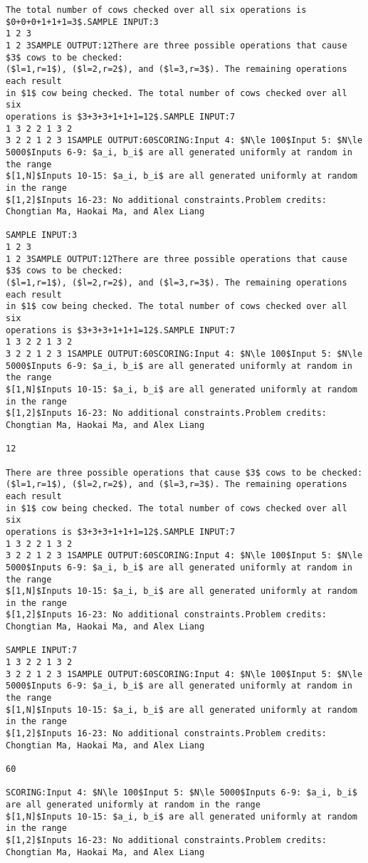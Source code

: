 \documentclass[12pt]{article}
\begin{document}
\begin{verbatim}
The total number of cows checked over all six operations is $0+0+0+1+1+1=3$.SAMPLE INPUT:3
1 2 3
1 2 3SAMPLE OUTPUT:12There are three possible operations that cause $3$ cows to be checked:
($l=1,r=1$), ($l=2,r=2$), and ($l=3,r=3$). The remaining operations each result
in $1$ cow being checked. The total number of cows checked over all six
operations is $3+3+3+1+1+1=12$.SAMPLE INPUT:7
1 3 2 2 1 3 2
3 2 2 1 2 3 1SAMPLE OUTPUT:60SCORING:Input 4: $N\le 100$Input 5: $N\le 5000$Inputs 6-9: $a_i, b_i$ are all generated uniformly at random in the range
$[1,N]$Inputs 10-15: $a_i, b_i$ are all generated uniformly at random in the range
$[1,2]$Inputs 16-23: No additional constraints.Problem credits: Chongtian Ma, Haokai Ma, and Alex Liang

SAMPLE INPUT:3
1 2 3
1 2 3SAMPLE OUTPUT:12There are three possible operations that cause $3$ cows to be checked:
($l=1,r=1$), ($l=2,r=2$), and ($l=3,r=3$). The remaining operations each result
in $1$ cow being checked. The total number of cows checked over all six
operations is $3+3+3+1+1+1=12$.SAMPLE INPUT:7
1 3 2 2 1 3 2
3 2 2 1 2 3 1SAMPLE OUTPUT:60SCORING:Input 4: $N\le 100$Input 5: $N\le 5000$Inputs 6-9: $a_i, b_i$ are all generated uniformly at random in the range
$[1,N]$Inputs 10-15: $a_i, b_i$ are all generated uniformly at random in the range
$[1,2]$Inputs 16-23: No additional constraints.Problem credits: Chongtian Ma, Haokai Ma, and Alex Liang

12

There are three possible operations that cause $3$ cows to be checked:
($l=1,r=1$), ($l=2,r=2$), and ($l=3,r=3$). The remaining operations each result
in $1$ cow being checked. The total number of cows checked over all six
operations is $3+3+3+1+1+1=12$.SAMPLE INPUT:7
1 3 2 2 1 3 2
3 2 2 1 2 3 1SAMPLE OUTPUT:60SCORING:Input 4: $N\le 100$Input 5: $N\le 5000$Inputs 6-9: $a_i, b_i$ are all generated uniformly at random in the range
$[1,N]$Inputs 10-15: $a_i, b_i$ are all generated uniformly at random in the range
$[1,2]$Inputs 16-23: No additional constraints.Problem credits: Chongtian Ma, Haokai Ma, and Alex Liang

SAMPLE INPUT:7
1 3 2 2 1 3 2
3 2 2 1 2 3 1SAMPLE OUTPUT:60SCORING:Input 4: $N\le 100$Input 5: $N\le 5000$Inputs 6-9: $a_i, b_i$ are all generated uniformly at random in the range
$[1,N]$Inputs 10-15: $a_i, b_i$ are all generated uniformly at random in the range
$[1,2]$Inputs 16-23: No additional constraints.Problem credits: Chongtian Ma, Haokai Ma, and Alex Liang

60

SCORING:Input 4: $N\le 100$Input 5: $N\le 5000$Inputs 6-9: $a_i, b_i$ are all generated uniformly at random in the range
$[1,N]$Inputs 10-15: $a_i, b_i$ are all generated uniformly at random in the range
$[1,2]$Inputs 16-23: No additional constraints.Problem credits: Chongtian Ma, Haokai Ma, and Alex Liang
\end{verbatim}
\end{document}
